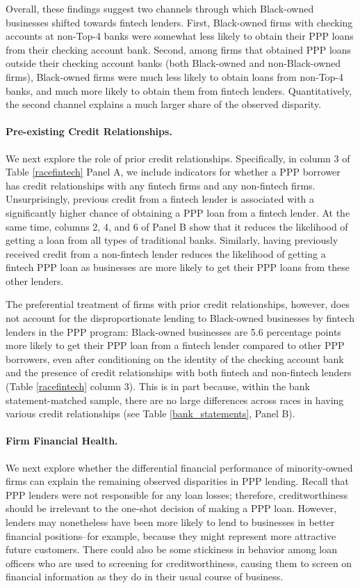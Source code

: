 \documentclass[11pt]{article}
\begin{document}
Overall, these findings suggest two channels through which Black-owned businesses shifted towards fintech lenders. First, Black-owned firms with checking accounts at non-Top-4 banks were somewhat less likely to obtain their PPP loans from their checking account bank. Second, among firms that obtained PPP loans outside their checking account banks (both Black-owned and non-Black-owned firms), Black-owned firms were much less likely to obtain loans from non-Top-4 banks, and much more likely to obtain them from fintech lenders. Quantitatively, the second channel explains a much larger share of the observed disparity.

\paragraph{Pre-existing Credit Relationships.}  We next explore the role of prior credit relationships. Specifically, in column 3 of Table \ref{racefintech} Panel A, we include indicators for whether a PPP borrower has credit relationships with any fintech firms and any non-fintech firms. Unsurprisingly, previous credit from a fintech lender is associated with a significantly higher chance of obtaining a PPP loan from a fintech lender. At the same time, columns 2, 4, and 6 of Panel B show that it reduces the likelihood of getting a loan from all types of traditional banks. Similarly, having previously received credit from a non-fintech lender reduces the likelihood of getting a fintech PPP loan as businesses are more likely to get their PPP loans from these other lenders. 

The preferential treatment of firms with prior credit relationships, however, does not account for the disproportionate lending to Black-owned businesses by fintech lenders in the PPP program: Black-owned businesses are 5.6 percentage points more likely to get their PPP loan from a fintech lender compared to other PPP borrowers, even after conditioning on the identity of the checking account bank and the presence of credit relationships with both fintech and non-fintech lenders (Table \ref{racefintech} column 3). This is in part because, within the bank statement-matched sample, there are no large differences across races in having various credit relationships (see Table \ref{bank_statements}, Panel B).

\paragraph{Firm Financial Health.} We next explore whether the differential financial performance of minority-owned firms can explain the remaining observed disparities in PPP lending. Recall that PPP lenders were not responsible for any  loan losses; therefore, creditworthiness should be irrelevant to the one-shot decision of making a PPP loan. However, lenders may nonetheless have been more likely to lend to businesses in better financial positions--for example, because they might represent more attractive future customers. There could also be some stickiness in behavior among loan officers who are used to screening for creditworthiness, causing them to screen on financial information as they do in their usual course of business.
\end{document}

